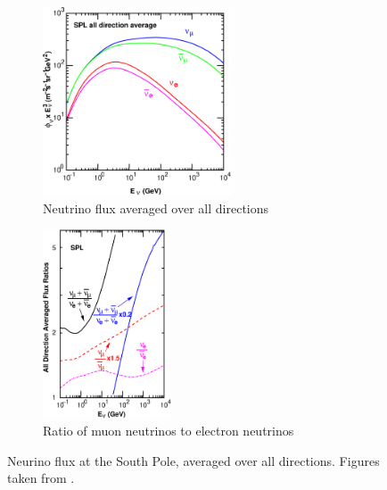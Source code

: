 \begin{figure}
\centering
\begin{subfigure}[t]{0.55\linewidth}
    \includegraphics[height=2.2in]{figures/flux/alldir-spl.eps}
\caption{Neutrino flux averaged over all directions\label{fig:flux-alldir}}
\end{subfigure}
\hfill
\begin{subfigure}[t]{0.35\linewidth}
    \includegraphics[height=2.2in]{figures/flux/spl-ratio-ally.eps}
\caption{Ratio of muon neutrinos to electron neutrinos\label{fig:flux-numu-ratio}}
\end{subfigure}
\caption{Neurino flux at the South Pole, averaged over all directions. Figures taken from \cite{Honda:2015fha}.}
\end{figure}

